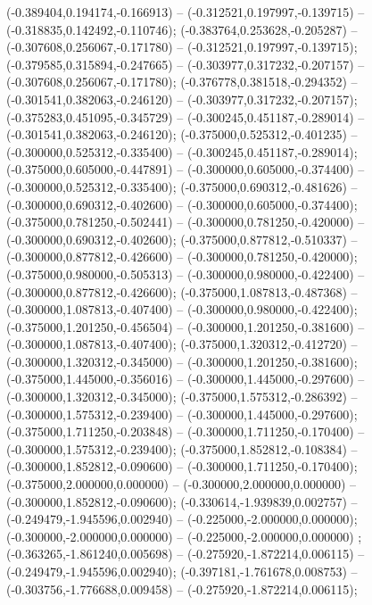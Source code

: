  (-0.389404,0.194174,-0.166913) -- (-0.312521,0.197997,-0.139715) -- (-0.318835,0.142492,-0.110746);
 (-0.383764,0.253628,-0.205287) -- (-0.307608,0.256067,-0.171780) -- (-0.312521,0.197997,-0.139715);
 (-0.379585,0.315894,-0.247665) -- (-0.303977,0.317232,-0.207157) -- (-0.307608,0.256067,-0.171780);
 (-0.376778,0.381518,-0.294352) -- (-0.301541,0.382063,-0.246120) -- (-0.303977,0.317232,-0.207157);
 (-0.375283,0.451095,-0.345729) -- (-0.300245,0.451187,-0.289014) -- (-0.301541,0.382063,-0.246120);
 (-0.375000,0.525312,-0.401235) -- (-0.300000,0.525312,-0.335400) -- (-0.300245,0.451187,-0.289014);
 (-0.375000,0.605000,-0.447891) -- (-0.300000,0.605000,-0.374400) -- (-0.300000,0.525312,-0.335400);
 (-0.375000,0.690312,-0.481626) -- (-0.300000,0.690312,-0.402600) -- (-0.300000,0.605000,-0.374400);
 (-0.375000,0.781250,-0.502441) -- (-0.300000,0.781250,-0.420000) -- (-0.300000,0.690312,-0.402600);
 (-0.375000,0.877812,-0.510337) -- (-0.300000,0.877812,-0.426600) -- (-0.300000,0.781250,-0.420000);
 (-0.375000,0.980000,-0.505313) -- (-0.300000,0.980000,-0.422400) -- (-0.300000,0.877812,-0.426600);
 (-0.375000,1.087813,-0.487368) -- (-0.300000,1.087813,-0.407400) -- (-0.300000,0.980000,-0.422400);
 (-0.375000,1.201250,-0.456504) -- (-0.300000,1.201250,-0.381600) -- (-0.300000,1.087813,-0.407400);
 (-0.375000,1.320312,-0.412720) -- (-0.300000,1.320312,-0.345000) -- (-0.300000,1.201250,-0.381600);
 (-0.375000,1.445000,-0.356016) -- (-0.300000,1.445000,-0.297600) -- (-0.300000,1.320312,-0.345000);
 (-0.375000,1.575312,-0.286392) -- (-0.300000,1.575312,-0.239400) -- (-0.300000,1.445000,-0.297600);
 (-0.375000,1.711250,-0.203848) -- (-0.300000,1.711250,-0.170400) -- (-0.300000,1.575312,-0.239400);
 (-0.375000,1.852812,-0.108384) -- (-0.300000,1.852812,-0.090600) -- (-0.300000,1.711250,-0.170400);
 (-0.375000,2.000000,0.000000) -- (-0.300000,2.000000,0.000000) -- (-0.300000,1.852812,-0.090600);
 (-0.330614,-1.939839,0.002757) -- (-0.249479,-1.945596,0.002940) -- (-0.225000,-2.000000,0.000000);
 (-0.300000,-2.000000,0.000000) -- (-0.225000,-2.000000,0.000000) ;
 (-0.363265,-1.861240,0.005698) -- (-0.275920,-1.872214,0.006115) -- (-0.249479,-1.945596,0.002940);
 (-0.397181,-1.761678,0.008753) -- (-0.303756,-1.776688,0.009458) -- (-0.275920,-1.872214,0.006115);
